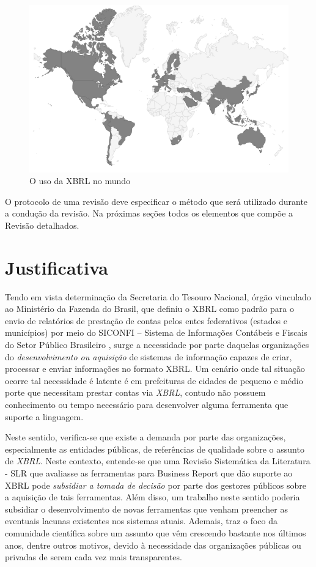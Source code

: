 \documentclass{article}
\begin{document}
\begin{figure}[htb]
\centering
\includegraphics[width=.75\textwidth]{../img/world-map.png}
\caption{O uso da XBRL no mundo}
\label{fig:world_map}
\end{figure}

O protocolo de uma revisão deve especificar o método que será utilizado durante a condução da revisão. Na próximas seções todos os elementos que compõe a Revisão detalhados.


\section{Justificativa}
\label{sec:justificativa}

Tendo em vista determinação da Secretaria do Tesouro Nacional, órgão
vinculado ao  Ministério da Fazenda do Brasil, que definiu o XBRL como
padrão para o envio de relatórios de prestação de contas pelos entes
federativos (estados e municípios) por meio do SICONFI – Sistema de Informações Contábeis e Fiscais do Setor Público Brasileiro \cite{nt_03_2013}, surge a necessidade por parte
daquelas organizações do \textit{desenvolvimento ou aquisição} de sistemas de
informação capazes de criar, processar e enviar informações no formato
XBRL. Um cenário onde tal situação ocorre tal necessidade é latente é em prefeituras de cidades de pequeno e médio porte que necessitam prestar contas via \textit{XBRL}, contudo
não possuem conhecimento ou tempo necessário para desenvolver alguma ferramenta que suporte a linguagem.

Neste sentido, verifica-se que existe a demanda por parte das organizações, especialmente as entidades públicas, de referências de qualidade sobre o assunto de \textit{XBRL}. Neste contexto, entende-se que uma Revisão Sistemática da Literatura - SLR  que avaliasse as ferramentas para Business Report que dão suporte ao XBRL pode \textit{subsidiar a tomada de decisão} por parte dos gestores públicos sobre a aquisição de tais ferramentas. Além disso, um trabalho neste sentido poderia subsidiar o desenvolvimento de novas ferramentas que venham preencher as eventuais lacunas existentes nos sistemas atuais. Ademais, traz o foco da comunidade científica sobre um assunto que vêm crescendo bastante nos últimos anos, dentre outros motivos, devido à necessidade das organizações públicas ou privadas de serem cada vez mais transparentes.
\end{document}
